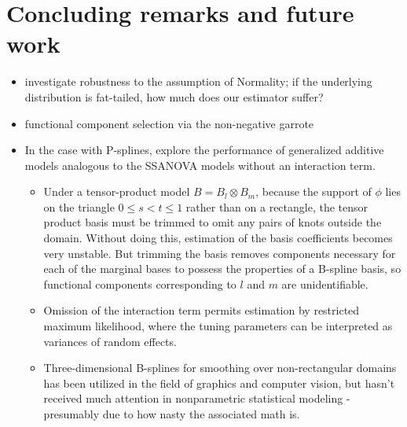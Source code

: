 
\chapter{Concluding remarks and future work}\label{concluding-remarks-chapter}

\begin{itemize}
\item investigate robustness to the assumption of Normality; if the underlying distribution is fat-tailed, how much does our estimator suffer?
\item functional component selection via the non-negative garrote
\item In the case with P-splines, explore the performance of generalized additive models analogous to the SSANOVA models without an interaction term.
	\begin{itemize}
	\item Under a tensor-product model $B = B_l \otimes B_m$, because the support of $\phi$ lies on the triangle $0 \le s < t \le 1$ rather than on a rectangle, the tensor product basis must be trimmed to omit any pairs of knots outside the domain. Without doing this, estimation of the basis coefficients becomes very unstable. But trimming the basis removes components necessary for each of the marginal bases to possess the properties of a B-spline basis, so functional components corresponding to $l$ and $m$ are unidentifiable. 
	\item Omission of the interaction term permits estimation by restricted maximum likelihood, where the tuning parameters can be interpreted as variances of random effects.
	\item Three-dimensional B-splines for smoothing over non-rectangular domains has been utilized in the field of graphics and computer vision, but hasn't received much attention in nonparametric statistical modeling - presumably due to how nasty the associated math is. 
	\end{itemize}
\end{itemize}

